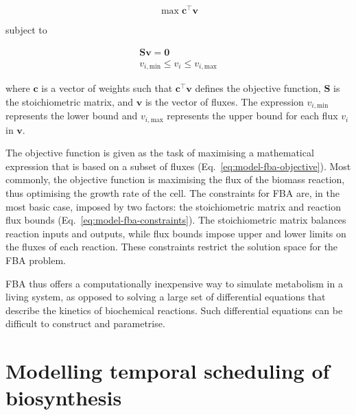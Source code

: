 \begin{equation}
  \max \mathbf{c}^{\intercal} \mathbf{v}
  \label{eq:model-fba-objective}
\end{equation}

subject to

\begin{equation}
  \begin{gathered}
    \mathbf{S} \mathbf{v} = \mathbf{0}\\
    v_{i,\mathrm{min}} \leq v_{i} \leq v_{i,\mathrm{max}}
  \end{gathered}
  \label{eq:model-fba-constraints}
\end{equation}

where $\mathbf{c}$ is a vector of weights such that $\mathbf{c}^{\intercal} \mathbf{v}$ defines the objective function, $\mathbf{S}$ is the stoichiometric matrix, and $\mathbf{v}$ is the vector of fluxes. The expression $v_{i,\mathrm{min}}$ represents the lower bound and $v_{i,\mathrm{max}}$ represents the upper bound for each flux $v_{i}$ in $\mathbf{v}$.

The objective function is given as the task of maximising a mathematical expression that is based on a subset of fluxes (Eq.\ \ref{eq:model-fba-objective}).
Most commonly, the objective function is maximising the flux of the biomass reaction, thus optimising the growth rate of the cell.
The constraints for FBA are, in the most basic case, imposed by two factors:
the stoichiometric matrix and reaction flux bounds (Eq.\ \ref{eq:model-fba-constraints}).
The stoichiometric matrix balances reaction inputs and outputs, while flux bounds impose upper and lower limits on the fluxes of each reaction.
These constraints restrict the solution space for the FBA problem.

FBA thus offers a computationally inexpensive way to simulate metabolism in a living system, as opposed to solving a large set of differential equations that describe the kinetics of biochemical reactions.
Such differential equations can be difficult to construct and parametrise.

\section{Modelling temporal scheduling of biosynthesis}
\label{sec:model-temporal}

